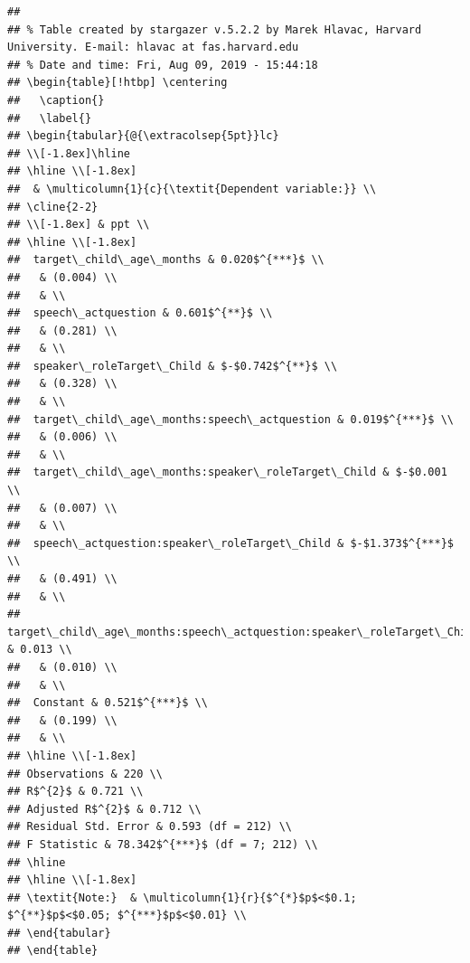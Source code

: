 \documentclass[,man,floatsintext]{apa6}
\begin{document}
\begin{verbatim}
## 
## % Table created by stargazer v.5.2.2 by Marek Hlavac, Harvard University. E-mail: hlavac at fas.harvard.edu
## % Date and time: Fri, Aug 09, 2019 - 15:44:18
## \begin{table}[!htbp] \centering 
##   \caption{} 
##   \label{} 
## \begin{tabular}{@{\extracolsep{5pt}}lc} 
## \\[-1.8ex]\hline 
## \hline \\[-1.8ex] 
##  & \multicolumn{1}{c}{\textit{Dependent variable:}} \\ 
## \cline{2-2} 
## \\[-1.8ex] & ppt \\ 
## \hline \\[-1.8ex] 
##  target\_child\_age\_months & 0.020$^{***}$ \\ 
##   & (0.004) \\ 
##   & \\ 
##  speech\_actquestion & 0.601$^{**}$ \\ 
##   & (0.281) \\ 
##   & \\ 
##  speaker\_roleTarget\_Child & $-$0.742$^{**}$ \\ 
##   & (0.328) \\ 
##   & \\ 
##  target\_child\_age\_months:speech\_actquestion & 0.019$^{***}$ \\ 
##   & (0.006) \\ 
##   & \\ 
##  target\_child\_age\_months:speaker\_roleTarget\_Child & $-$0.001 \\ 
##   & (0.007) \\ 
##   & \\ 
##  speech\_actquestion:speaker\_roleTarget\_Child & $-$1.373$^{***}$ \\ 
##   & (0.491) \\ 
##   & \\ 
##  target\_child\_age\_months:speech\_actquestion:speaker\_roleTarget\_Child & 0.013 \\ 
##   & (0.010) \\ 
##   & \\ 
##  Constant & 0.521$^{***}$ \\ 
##   & (0.199) \\ 
##   & \\ 
## \hline \\[-1.8ex] 
## Observations & 220 \\ 
## R$^{2}$ & 0.721 \\ 
## Adjusted R$^{2}$ & 0.712 \\ 
## Residual Std. Error & 0.593 (df = 212) \\ 
## F Statistic & 78.342$^{***}$ (df = 7; 212) \\ 
## \hline 
## \hline \\[-1.8ex] 
## \textit{Note:}  & \multicolumn{1}{r}{$^{*}$p$<$0.1; $^{**}$p$<$0.05; $^{***}$p$<$0.01} \\ 
## \end{tabular} 
## \end{table}
\end{verbatim}
\end{document}
